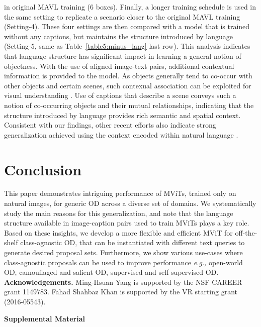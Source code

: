 \documentclass[runningheads]{llncs}
\def\eg{\emph{e.g.,}\xspace} \def\Eg{\emph{E.g.}\xspace}
\begin{document}
in original MAVL training (6 boxes). Finally, a longer training schedule is used in the same setting to replicate a scenario closer to the original MAVL training (Setting-4). These four settings are then compared with a model that is trained without any captions, but maintains the structure introduced by language (Setting-5, same as Table~\ref{table5:minus_lang} last row). This analysis indicates that language structure has significant impact in learning a general notion of objectness. With the use of aligned image-text pairs, additional contextual information is provided to the model. As objects generally tend to co-occur with other objects and certain scenes, such contexual association can be exploited for visual understanding \cite{OLIVA2007520}. Use of captions that describe a scene conveys such a notion of co-occurring objects and their mutual relationships, indicating that the structure introduced by language provides rich semantic and spatial context. Consistent with our findings, other recent efforts also indicate strong generalization achieved using the context encoded within natural language \cite{zhang2020putting,radford2021learning,zareian2021open,zhou2021uc2}.

\section{Conclusion}
This paper demonstrates intriguing performance of MViTs, trained only on natural images, for generic OD across a diverse set of domains. We systematically study the main reasons for this generalization, and note that the language structure available in  image-caption pairs used to train MViTs plays a key role. Based on these insights, we develop a more flexible and efficient MViT for off-the-shelf class-agnostic OD, that can be instantiated with different text queries to generate desired proposal sets. Furthermore, we show various use-cases where class-agnostic proposals can be used to improve performance \eg open-world OD, camouflaged and salient OD, supervised and self-supervised OD.\\

\noindent \textbf{Acknowledgements.} Ming-Hsuan Yang is supported by the NSF CAREER grant 1149783. Fahad Shahbaz Khan is supported by the VR starting grant (2016-05543).

\clearpage


\clearpage

\appendix
\begin{center}
\textbf{\Large Supplemental Material}
\end{center}
\end{document}
